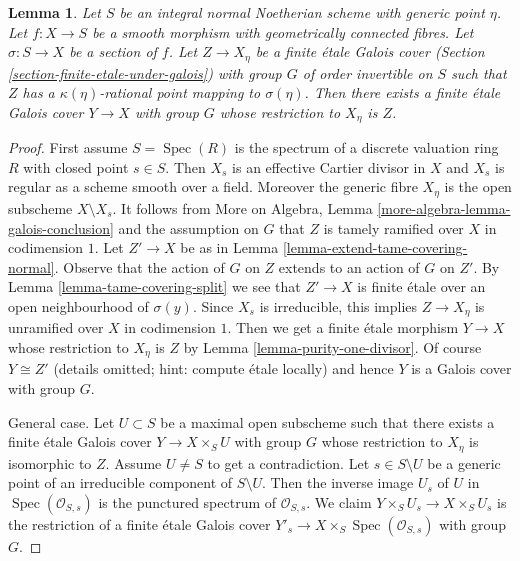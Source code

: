 \documentclass{stacks-project}
\theoremstyle{plain}
\newtheorem{lemma}[subsection]{Lemma}
\theoremstyle{definition}
\theoremstyle{remark}
\numberwithin{equation}{subsection}
\def\Spec{\mathop{\mathrm{Spec}}}
\begin{document}
\begin{lemma}
\label{lemma-extend-covering}
Let $S$ be an integral normal Noetherian scheme with generic point $\eta$.
Let $f : X \to S$ be a smooth morphism with geometrically connected fibres.
Let $\sigma : S \to X$ be a section of $f$. Let $Z \to X_\eta$ be a
finite \'etale Galois cover (Section \ref{section-finite-etale-under-galois})
with group $G$ of order invertible on $S$ such that
$Z$ has a $\kappa(\eta)$-rational point mapping to $\sigma(\eta)$.
Then there exists a finite \'etale Galois cover $Y \to X$ with group $G$
whose restriction to $X_\eta$ is $Z$.
\end{lemma}

\begin{proof}
First assume $S = \Spec(R)$ is the spectrum of a discrete valuation ring $R$
with closed point $s \in S$. Then $X_s$ is an effective Cartier
divisor in $X$ and $X_s$ is regular as a scheme smooth over a field.
Moreover the generic fibre $X_\eta$ is the open subscheme $X \setminus X_s$.
It follows from
More on Algebra, Lemma \ref{more-algebra-lemma-galois-conclusion}
and the assumption on $G$ that $Z$ is tamely ramified
over $X$ in codimension $1$. Let $Z' \to X$ be as in
Lemma \ref{lemma-extend-tame-covering-normal}. Observe that
the action of $G$ on $Z$ extends to an action of $G$ on $Z'$.
By Lemma \ref{lemma-tame-covering-split}
we see that $Z' \to X$ is finite \'etale over an open
neighbourhood of $\sigma(y)$.
Since $X_s$ is irreducible, this implies $Z \to X_\eta$
is unramified over $X$ in codimension $1$.
Then we get a finite \'etale morphism $Y \to X$
whose restriction to $X_\eta$ is $Z$ by
Lemma \ref{lemma-purity-one-divisor}.
Of course $Y \cong Z'$ (details omitted; hint: compute \'etale locally)
and hence $Y$ is a Galois cover with group $G$.

\medskip\noindent
General case. Let $U \subset S$ be a maximal open subscheme
such that there exists a finite \'etale Galois cover
$Y \to X \times_S U$ with group $G$
whose restriction to $X_\eta$ is isomorphic to $Z$.
Assume $U \not = S$ to get a contradiction.
Let $s \in S \setminus U$ be a generic point of an irreducible
component of $S \setminus U$. Then the inverse image $U_s$
of $U$ in $\Spec(\mathcal{O}_{S, s})$
is the punctured spectrum of $\mathcal{O}_{S, s}$.
We claim $Y \times_S U_s \to X \times_S U_s$
is the restriction of a finite \'etale Galois cover
$Y'_s \to X \times_S \Spec(\mathcal{O}_{S, s})$
with group $G$.


\end{proof}
\end{document}
